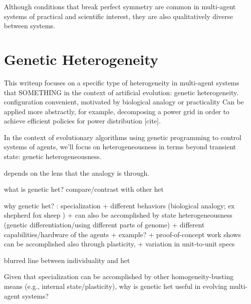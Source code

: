 Although conditions that break perfect symmetry are common in multi-agent systems of practical and scientific interest, they are also qualitatively diverse between systems.

\section{Genetic Heterogeneity}

This writeup focuses on a specific type of heterogeneity in multi-agent systems that SOMETHING in the context of artificial evolution: genetic heterogeneity.
configuration
convenient, motivated by biological analogy or practicality
Can be applied more abstractly, for example, decomposing a power grid in order to achieve efficient policies for power distribution [cite].

In the context of evolutionary algorithms using genetic programming to control systems of agents, we'll focus on heterogeneousness in terms beyond transient state: genetic heterogeneousness.

depends on the lens that the analogy is through.

what is genetic het?
compare/contrast with other het

why genetic het? : specialization
+ different behaviors (biological analogy; ex shepherd fox sheep \cite{potter2001heterogeneity} )
  + can also be accomplished by state heterogeneousness (genetic differentiation/using different parts of genome) \cite{ferrante2015evolution}
+ different capabilities/hardware of the agents \cite{mathews2012supervised}
  + example?
  + proof-of-concept work shows can be accomplished also through plasticity, \cite{tuci2008evolving}
  + variation in unit-to-unit specs \cite{pugh2007parallel} \cite{duarte2016evolution}

blurred line between individuality and het

Given that specialization can be accomplished by other homogeneity-busting means (e.g., internal state/plasticity), why is genetic het useful in evolving multi-agent systems?
